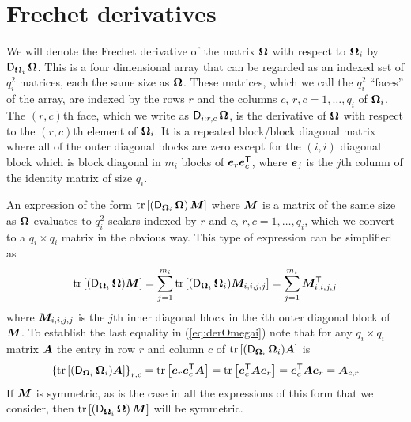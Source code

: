 \documentclass[12pt]{article}
\begin{document}
\section{Frechet derivatives}
\label{sec:Frechet}

We will denote the Frechet derivative of the matrix $\bm{\Omega}$ with
respect to $\bm{\Omega}_i$ by $\operatorname{\mathsf{D}}_{\bm{\Omega}_i}\bm{\Omega}$.  This is a four
dimensional array that can be regarded as an indexed set of $q_i^2$
matrices, each the same size as $\bm{\Omega}$.  These matrices, which we
call the $q_i^2$ ``faces'' of the array, are indexed by the rows $r$
and the columns $c$, $r,c=1,\dots,q_i$ of $\bm{\Omega}_i$.  The $(r,c)$th
face, which we write as $\operatorname{\mathsf{D}}_{i:r,c}\bm{\Omega}$, is the derivative of
$\bm{\Omega}$ with respect to the $(r,c)$th element of $\bm{\Omega}_i$. It is
a repeated block/block diagonal matrix where all of the outer diagonal
blocks are zero except for the $(i,i)$ diagonal block which is block
diagonal in $m_i$ blocks of $\bm{e}_r\bm{e}_c^\mathsf{T}$, where $\bm{e}_j$ is
the $j$th column of the identity matrix of size $q_i$.

An expression of the form
$\operatorname{tr}\left[\left(\operatorname{\mathsf{D}}_{\bm{\Omega}_i}\bm{\Omega}\right)\bm{M}\right]$ where $\bm{M}$
is a matrix of the same size as $\bm{\Omega}$ evaluates to $q_i^2$ scalars
indexed by $r$ and $c$, $r,c=1,\dots,q_i$, which we convert to a
$q_i\times q_i$ matrix in the obvious way.  This type of expression
can be simplified as
\begin{equation}
  \label{eq:derOmegai}
  \operatorname{tr}\left[(\operatorname{\mathsf{D}}_{\bm{\Omega}_i}\bm{\Omega})\bm{M}\right]
  = \sum_{j=1}^{m_i}\operatorname{tr}\left[(\operatorname{\mathsf{D}}_{\bm{\Omega}_i}\bm{\Omega}_i)\bm{M}_{i,i,j,j}\right]
  = \sum_{j=1}^{m_i}\bm{M}_{i,i,j,j}^\mathsf{T}
\end{equation}
where $\bm{M}_{i,i,j,j}$ is the $j$th inner diagonal block in the $i$th
outer diagonal block of $\bm{M}$.  To establish the last equality in
(\ref{eq:derOmegai}) note that for any $q_i\times q_i$ matrix $\bm{A}$
the entry in row $r$ and column $c$ of
$\operatorname{tr}\left[(\operatorname{\mathsf{D}}_{\bm{\Omega}_i}\bm{\Omega}_i)\bm{A}\right]$ is
\begin{equation}
  \label{eq:rowRcolCentry}
  \left\{\operatorname{tr}\left[(\operatorname{\mathsf{D}}_{\bm{\Omega}_i}\bm{\Omega}_i)\bm{A}\right]\right\}_{r,c}
  = \operatorname{tr}\left[\bm{e}_r\bm{e}_c^\mathsf{T}\bm{A}\right]
  = \operatorname{tr}\left[\bm{e}_c^\mathsf{T}\bm{A}\bm{e}_r\right]
  = \bm{e}_c^\mathsf{T}\bm{A}\bm{e}_r
  = \bm{A}_{c,r}
\end{equation}
If $\bm{M}$ is symmetric, as is the case in all the expressions of this
form that we consider, then
$\operatorname{tr}\left[\left(\operatorname{\mathsf{D}}_{\bm{\Omega}_i}\bm{\Omega}\right)\bm{M}\right]$ will be
symmetric.
\end{document}
